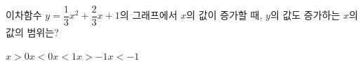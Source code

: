 이차함수 $y=\dfrac{1}{3}x^2+\dfrac{2}{3}x+1$의 그래프에서 $x$의 값이 증가할 때, $y$의 값도 증가하는 $x$의 값의 범위는?
\begin{choices32}{$x>0$}{$x<0$}{$x<1$}{$x>-1$}{$x<-1$}\end{choices32}
